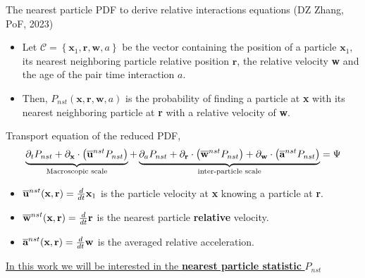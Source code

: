 \documentclass{sintefbeamer}
\begin{document}
\begin{frame}{The nearest particle PDF to derive relative interactions equations (DZ Zhang, PoF, 2023)}
  \begin{definition}
    \begin{itemize}
      \item Let $\mathscr{C} =\left\{\textbf{x}_1, \textbf{r}, \textbf{w},a\right\}$ be the vector containing the position of a particle $\textbf{x}_1$, its nearest neighboring particle relative position $\textbf{r}$, the relative velocity \textbf{w} and the age of the pair time interaction $a$.
      \item Then, $P_{nst}(\textbf{x},\textbf{r},\textbf{w},a) $ is the probability of finding a particle at \textbf{x} with its nearest neighboring particle at \textbf{r} with a relative velocity of \textbf{w}. 
    \end{itemize}
  \end{definition}
  Transport equation of the reduced PDF,
  \begin{equation*}
    \underbrace{
      \partial_t P_{nst}
      +  \partial_{\textbf{x}} \cdot
      \left(
        \overline{\textbf{u}}^{nst}
        P_{nst}
      \right)
    }_{\text{Macroscopic scale}}
    + 
    \underbrace{
       \partial_a 
        P_{nst}
      + \partial_{\textbf{r}} \cdot
    \left(
        \overline{\textbf{w}}^{nst}
        P_{nst}
    \right)
      +  \partial_{\textbf{w}} \cdot
    \left(
        \overline{\textbf{a}}^{nst}
        P_{nst}
    \right)
    }_{\text{inter-particle scale}}
    = \Psi
    \label{eq:dt_P_nst}
\end{equation*}

  \begin{itemize}
    \item $\overline{\textbf{u}}^{nst}(\textbf{x},\textbf{r}) = \frac{d}{dt} \textbf{x}_1$ is the particle velocity at \textbf{x} knowing a particle at \textbf{r}. 
    \item $\overline{\textbf{w}}^{nst}(\textbf{x},\textbf{r}) = \frac{d}{dt} \textbf{r}$ is the nearest particle \textbf{relative} velocity. 
    \item $\overline{\textbf{a}}^{nst}(\textbf{x},\textbf{r}) = \frac{d}{dt} \textbf{w}$ is the averaged relative acceleration.
  \end{itemize}
  \underline{In this work we will be interested in the \textbf{nearest particle statistic} $P_{nst}$}
\end{frame}
\end{document}
